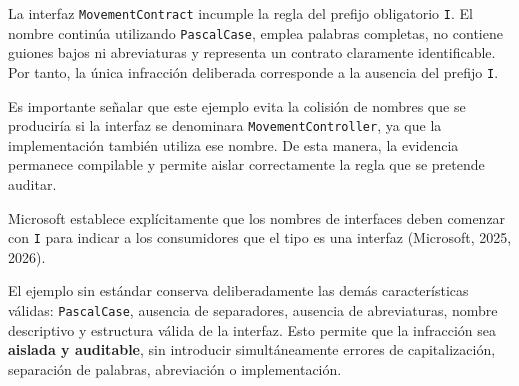 La interfaz \texttt{MovementContract} incumple la regla del prefijo obligatorio \texttt{I}. El nombre continúa utilizando \texttt{PascalCase}, emplea palabras completas, no contiene guiones bajos ni abreviaturas y representa un contrato claramente identificable. Por tanto, la única infracción deliberada corresponde a la ausencia del prefijo \texttt{I}.

Es importante señalar que este ejemplo evita la colisión de nombres que se produciría si la interfaz se denominara \texttt{MovementController}, ya que la implementación también utiliza ese nombre. De esta manera, la evidencia permanece compilable y permite aislar correctamente la regla que se pretende auditar.

Microsoft establece explícitamente que los nombres de interfaces deben comenzar con \texttt{I} para indicar a los consumidores que el tipo es una interfaz (Microsoft, 2025, 2026).

El ejemplo sin estándar conserva deliberadamente las demás características válidas: \texttt{PascalCase}, ausencia de separadores, ausencia de abreviaturas, nombre descriptivo y estructura válida de la interfaz. Esto permite que la infracción sea \textbf{aislada y auditable}, sin introducir simultáneamente errores de capitalización, separación de palabras, abreviación o implementación.